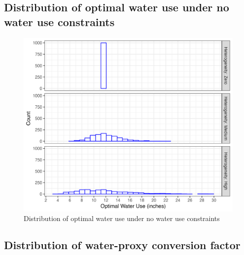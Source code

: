\documentclass[
]{article}
\begin{document}
\clearpage

\appendix


\subsection{Distribution of optimal water use under no water use constraints}\label{distribution-of-optimal-water-use-under-no-water-use-constraints}

\begin{figure}[H]

{\centering \includegraphics{figures/g_opt_w_dist} 

}

\caption{Distribution of optimal water use under no water use constraints}\label{fig:dist-opt-w}
\end{figure}

\subsection{Distribution of water-proxy conversion factor}\label{distribution-of-water-proxy-conversion-factor}

\clearpage

  
\end{document}
